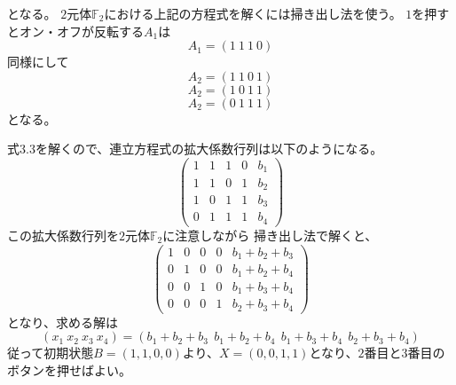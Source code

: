 \documentclass[uplatex,dvipdfmx]{ujreport}
\begin{document}
となる。
$2$元体$\mathbb{F}_2$における上記の方程式を解くには掃き出し法を使う。
$1$を押すとオン・オフが反転する$A_1$は
\[
 A_1=(1\ 1\ 1\ 0)
\]
同様にして
\[
 A_2=(1\ 1\ 0\ 1)
\]
\[
 A_2=(1\ 0\ 1\ 1)
\]
\[
 A_2=(0\ 1\ 1\ 1)
\]となる。

式3.3を解くので、連立方程式の拡大係数行列は以下のようになる。
\[
  \left(
    \begin{array}{ccccc}
      1 & 1 & 1 & 0 & b_1 \\
      1 & 1 & 0 & 1 & b_2 \\
      1 & 0 & 1 & 1 & b_3 \\
      0 & 1 & 1 & 1 & b_4
    \end{array}
  \right)
\]
この拡大係数行列を$2$元体$\mathbb{F}_2$に注意しながら
掃き出し法で解くと、
\[
  \left(
    \begin{array}{ccccc}
     1 & 0 & 0 & 0 & b_1+b_2+b_3 \\
     0 & 1 & 0 & 0 & b_1+b_2+b_4\\
     0 & 0 & 1 & 0 & b_1+b_3+b_4 \\
     0 & 0 & 0 & 1 & b_2+b_3+b_4
    \end{array}
  \right)
\]
となり、求める解は
\[
 (x_1\ x_2\ x_3\ x_4) = (b_1+b_2+b_3\ \ b_1+b_2+b_4\ \ b_1+b_3+b_4\ \ b_2+b_3+b_4)
\]
従って初期状態$B=(1,1,0,0)$より、$X=(0,0,1,1)$となり、$2$番目と$3$番目のボタンを押せばよい。
\end{document}
